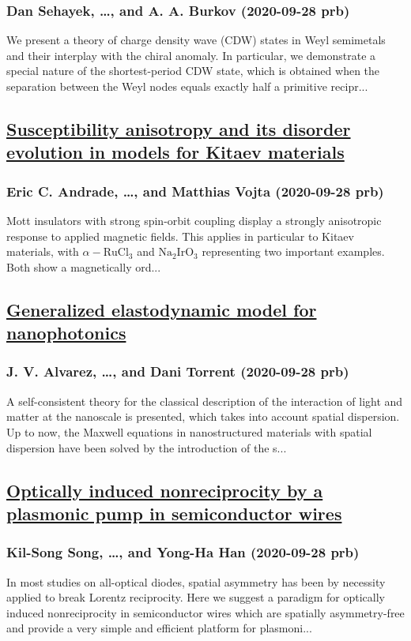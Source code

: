 \subsubsection*{Dan Sehayek, \dots, and A. A. Burkov (2020-09-28 prb)}
We present a theory of charge density wave (CDW) states in Weyl semimetals and their interplay with the chiral anomaly. In particular, we demonstrate a special nature of the shortest-period CDW state, which is obtained when the separation between the Weyl nodes equals exactly half a primitive recipr...
\subsection*{\href{http://link.aps.org/doi/10.1103/PhysRevB.102.115160}{Susceptibility anisotropy and its disorder evolution in models for Kitaev materials}}
\subsubsection*{Eric C. Andrade, \dots, and Matthias Vojta (2020-09-28 prb)}
Mott insulators with strong spin-orbit coupling display a strongly anisotropic response to applied magnetic fields. This applies in particular to Kitaev materials, with $α−{\mathrm{RuCl}}_{3}$ and ${\mathrm{Na}}_{2}{\mathrm{IrO}}_{3}$ representing two important examples. Both show a magnetically ord...
\subsection*{\href{http://link.aps.org/doi/10.1103/PhysRevB.102.115308}{Generalized elastodynamic model for nanophotonics}}
\subsubsection*{J. V. Alvarez, \dots, and Dani Torrent (2020-09-28 prb)}
A self-consistent theory for the classical description of the interaction of light and matter at the nanoscale is presented, which takes into account spatial dispersion. Up to now, the Maxwell equations in nanostructured materials with spatial dispersion have been solved by the introduction of the s...
\subsection*{\href{http://link.aps.org/doi/10.1103/PhysRevB.102.115435}{Optically induced nonreciprocity by a plasmonic pump in semiconductor wires}}
\subsubsection*{Kil-Song Song, \dots, and Yong-Ha Han (2020-09-28 prb)}
In most studies on all-optical diodes, spatial asymmetry has been by necessity applied to break Lorentz reciprocity. Here we suggest a paradigm for optically induced nonreciprocity in semiconductor wires which are spatially asymmetry-free and provide a very simple and efficient platform for plasmoni...
